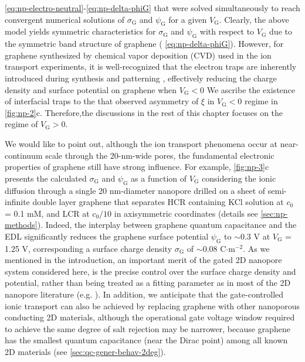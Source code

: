 \autoref{eq:np-electro-neutral}-\autoref{eq:np-delta-phiG} that were
solved simultaneously to reach convergent numerical solutions of
$\sigma_{\mathrm{G}}$ and $\psi_{\mathrm{G}}$ for a given
$V_{\mathrm{G}}$. Clearly, the above model yields symmetric
characteristics for $\sigma_{\mathrm{G}}$ and $\psi_{\mathrm{G}}$ with
respect to $V_{\mathrm{G}}$ due to the symmetric band structure of
graphene ( \autoref{eq:np-delta-phiG}).
%
However, for graphene
synthesized by chemical vapor deposition (CVD) used in the ion transport
experiments, it is well-recognized that the electron traps are
inherently introduced during synthesis and patterning
\cite{Dean_2010_BN_gr_highquality}, effectively reducing the charge
density and surface potential on graphene when $V_{\mathrm{G}}<0$
We ascribe the existence of interfacial traps to the
that observed asymmetry of $\xi$ in  $V_{\mathrm{G}}<0$ regime
in \autoref{fig:np-2}c.
%
Therefore,the discussions in the rest of this chapter focuses on the
regime of $V_{\mathrm{G}}>0$.

We would like to point out, although the ion transport phenomena occur
at near-continuum scale through the 20-nm-wide pores, the fundamental
electronic properties of graphene still have strong influence.
%
For
example, \autoref{fig:np-3}c presents the calculated
$\sigma_{\mathrm{G}}$ and $\psi_{\mathrm{G}}$ as a function of
$V_{\mathrm{G}}$ considering the ionic diffusion through a single 20
nm-diameter nanopore drilled on a sheet of semi-infinite double layer
graphene that separates HCR containing KCl solution at $c_{0}$ = 0.1
mM, and LCR at $c_{0}/10$ in axisymmetric coordinates (details see \autoref{sec:np-methods}). Indeed, the
interplay between graphene quantum capacitance and the EDL
significantly reduces the graphene surface potential
$\psi_{\mathrm{G}}$ to $\sim$0.3 V at $V_{\mathrm{G}}$ = 1.25 V,
corresponding a surface charge density $\sigma_{\mathrm{G}}$ of
$\sim$0.08 C$\cdot$m$^{-2}$.
As we mentioned in the introduction, an
important merit of the gated 2D nanopore system considered here,
is the precise control over the
surface charge density and potential,
rather than being treated as a fitting parameter as in most of the 2D
nanopore literature (e.g. \cite{Rollings_2016_gating}).
%
In addition, we anticipate that the gate-controlled ionic transport
can also be achieved by replacing graphene with other nanoporous
conducting 2D materials, although the operational gate voltage window
required to achieve the same degree of salt rejection may be narrower,
because graphene has the smallest quantum capacitance (near the Dirac
point) among all known 2D materials (see
\autoref{sec:qc-gener-behav-2deg}).

